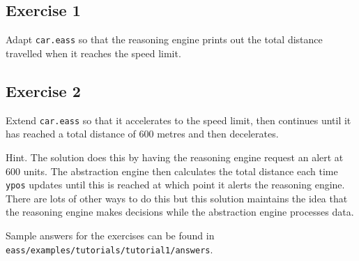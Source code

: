 \documentclass[a4]{article}
\begin{document}
\subsection{Exercise 1}
Adapt \texttt{car.eass} so that the reasoning engine prints out the total distance travelled when it reaches the speed limit.

\subsection{Exercise 2}
Extend \texttt{car.eass} so that it accelerates to the speed limit, then continues until it has reached a total distance of 600 metres and then decelerates.  

Hint. The solution does this by having the reasoning engine request an alert at 600 units.  The abstraction engine then calculates the total distance each time \texttt{ypos} updates until this is reached at which point it alerts the reasoning engine.  There are lots of other ways to do this but this solution maintains the idea that the reasoning engine makes decisions while the abstraction engine processes data.  

\begin{sloppypar}
Sample answers for the exercises can be found in \texttt{eass/examples/tutorials/tutorial1/answers}.
\end{sloppypar}


\end{document}
